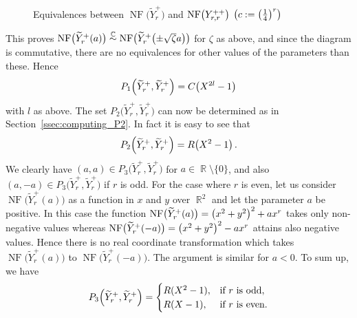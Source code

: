 \documentclass{amsproc}
\theoremstyle{definition}
\let\originalleft\left
\let\originalright\right
\renewcommand{\left}{\mathopen{}\mathclose\bgroup\originalleft}
\renewcommand{\right}{\aftergroup\egroup\originalright}
\newcommand{\tY}{\widetilde{Y}}
\DeclareMathOperator{\R}{\mathbb{R}}
\DeclareMathOperator{\C}{\mathbb{C}}
\DeclareMathOperator{\NF}{NF}
\newcommand{\csim}{\ensuremath{\mathrel{%
  \raisebox{0pt}[\heightof{$\overset{\scriptscriptstyle\C}{\sim}$}]{%
    $\overset{\C}{\sim}$%
  }%
}}}
\begin{document}
\begin{figure}
\caption{Equivalences between $\NF\bigl(\tY_r^+\bigr)$ and%
$\NF\left(Y_{r,r}^{++}\right)$\quad%
$\left(c := \left(\frac{1}{4}\right)^r\right)$}%
\label{fig:Yr}
\begin{center}
\end{center}
\end{figure}

This proves
$\NF\bigl(\tY_r^+(a)\bigr)
\csim \NF\bigl(\tY_r^+\left(\pm\sqrt{\zeta}a\right)\bigr)$
for $\zeta$ as above, and since the diagram is commutative, there are no
equivalences for other values of the parameters than these. Hence
\[
P_1\left(\tY_r^+, \tY_r^+\right) = C\left(X^{2l}-1\right)
\]
with $l$ as above. The set $P_2\bigl(\tY_r^+, \tY_r^+\bigr)$ can now be
determined as in Section~\ref{ssec:computing_P2}. In fact it is easy to see
that
\[
P_2\left(\tY_r^+, \tY_r^+\right) = R\left(X^2-1\right) \,.
\]
We clearly have $(a, a) \in P_3\bigl(\tY_r^+, \tY_r^+\bigr)$ for
$a \in \R \setminus \{0\}$, and also
$(a, -a) \in P_3\bigl(\tY_r^+, \tY_r^+\bigr)$ if $r$ is odd. For the case where
$r$ is even, let us consider $\NF\bigl(\tY_r^+(a)\bigr)$ as a function in $x$
and $y$ over $\R^2$ and let the parameter $a$ be positive. In this case the
function $\NF\bigl(\tY_r^+(a)\bigr) = \left(x^2+y^2\right)^2+ax^r$ takes only
non-negative values whereas
$\NF\bigl(\tY_r^+(-a)\bigr) = \left(x^2+y^2\right)^2-ax^r$ attains also
negative values. Hence there is no real coordinate transformation which takes
$\NF\bigl(\tY_r^+(a)\bigr)$ to $\NF\bigl(\tY_r^+(-a)\bigr)$. The argument is
similar for $a < 0$. To sum up, we have
\[
P_3\left(\tY_r^+, \tY_r^+\right) =
\begin{cases}
R(X^2-1), &\text{if } r \text{ is odd}, \\
R(X-1),   &\text{if } r \text{ is even}.
\end{cases}
\]
\end{document}
